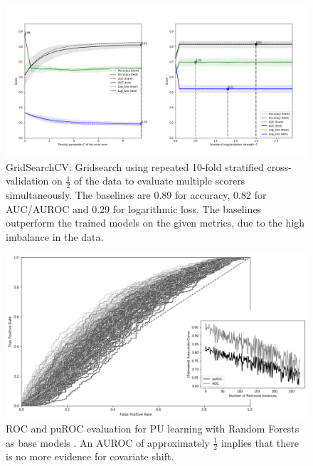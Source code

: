 \begin{figure}[ht]
\centering
   \includegraphics[scale=0.38,angle=0]{fig/gridfigure}
\captionsetup{width= 400pt}
\caption{GridSearchCV: Gridsearch using repeated 10-fold stratified cross-validation on \(\frac{1}{2}\) of the data to evaluate multiple scorers simultaneously. The baselines are 0.89 for accuracy, 0.82 for AUC/AUROC and 0.29 for logarithmic loss. The baselines outperform the trained models on the given metrics, due to the high imbalance in the data.}
   \label{fig:Ng1} 
\end{figure}

\begin{figure}[ht]
\centering
   \includegraphics[scale=0.40,angle=0]{fig/res}
\captionsetup{width= 360pt}
\caption{ROC and puROC evaluation for PU learning with Random Forests as base models \cite{breiman2}. An AUROC of approximately \(\frac{1}{2}\) implies that there is no more evidence for covariate shift.}
   \label{fig:Ng1} 
\end{figure}
